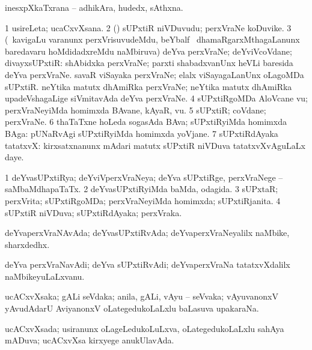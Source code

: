 \bentry
{}
\gl{\nA}
\bmng
inesxpXkaTxrana -- adhikAra, hudedx, sAthxna. 
\emng
\eentry

\bentry
{}
\gl{\nA}
\bmng
\bnum
\num{1} usireLeta; ucaCxvXsana. 
\num{2} (\rUpa) sUPxtiR niVDuvudu; perxVraNe koDuvike. 
\num{3} (\kanmu\ kavigaLu \mo varanunx perxVrisuvudeMdu, beYbalf \mo\ dhamaRgarxMthagaLanunx baredavaru hoMdidadxreMdu naMbiruva) deYva perxVraNe; deYviVcoVdane; divayxsUPxtiR:  shAbidxka perxVraNe; parxti shabadxvanUnx heVLi baresida deYva perxVraNe.  savaR viSayaka perxVraNe; elalx viSayagaLanUnx oLagoMDa sUPxtiR.  neYtika matutx dhAmiRka perxVraNe; neYtika matutx dhAmiRka upadeVshagaLige siVmitavAda deYva perxVraNe. 
\num{4} sUPxtiRgoMDa AloVcane \mo vu; perxVraNeyiMda homimxda BAvane, kAyaR, \mo vu. 
\num{5} sUPxtiR; coVdane; perxVraNe. 
\num{6} thaTaTxne hoLeda sogasAda BAva; sUPxtiRyiMda homimxda BAga:  pUNaRvAgi sUPxtiRyiMda homimxda yoVjane. 
\num{7} sUPxtiRdAyaka tatatxvX:  kirxsatxnanunx mAdari matutx sUPxtiR niVDuva tatatxvXvAguLaLx daye. 
\enum
\emng
\eentry

\bentry
{}
\gl{\gu}
\bmng
\bnum
\num{1} deYvasUPxtiRya; deYviVperxVraNeya; deYva sUPxtiRge, perxVraNege -- saMbaMdhapaTaTx. 
\num{2} deYvasUPxtiRyiMda baMda, odagida. 
\num{3} sUPxtaR; perxVrita; sUPxtiRgoMDa; perxVraNeyiMda homimxda; sUPxtiRjanita. 
\num{4} sUPxtiR niVDuva; sUPxtiRdAyaka; perxVraka. 
\enum
\emng
\eentry

\bentry
{}
\gl{\nA}
\bmng
deYvaperxVraNAvAda; deYvasUPxtiRvAda; deYvaperxVraNeyalilx naMbike, sharxdedhx. 
\emng
\eentry

\bentry
{}
\gl{\nA}
\bmng
deYva perxVraNavAdi; deYva sUPxtiRvAdi; deYvaperxVraNa tatatxvXdalilx naMbikeyuLaLxvanu. 
\emng
\eentry

\bentry
{}
\gl{\nA}
\bmng
ucACxvXsaka; gALi seVdaka; anila, gALi, vAyu -- seVvaka; vAyuvanonxV yAvudAdarU AviyanonxV oLategedukoLaLxlu baLasuva upakaraNa. 
\emng
\eentry

\bentry
{}
\gl{\gu}
\bmng
ucACxvXsada; usiranunx oLageLedukoLuLxva, oLategedukoLaLxlu sahAya mADuva; ucACxvXsa kirxyege anukUlavAda. 
\emng
\eentry

